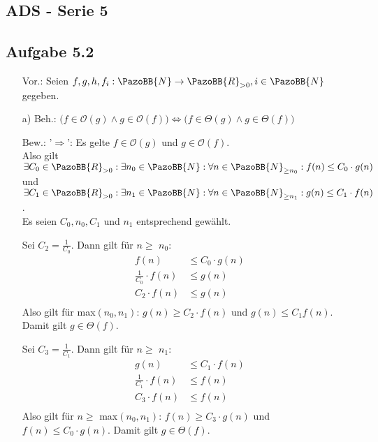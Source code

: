 \documentclass[12pt]{article}
\newcommand {\N}{\PazoBB{N}}   %
\newcommand {\R}{\PazoBB{R}}   %
\newcommand {\Om}{\mathcal{O}} %
\begin{document}
\subsection*{ADS - Serie 5}
\subsection*{Aufgabe 5.2}
\begin{enumerate}
\item[Vor.:] Seien $f, g, h, f_i: \N \to \R_{>0}, i\in\N$ gegeben.
\item[a) Beh.:] 
          $\big(f\in \Om(g) \land g \in \Om(f) \big) \Longleftrightarrow \big(f \in \Theta(g) \land g\in \Theta(f) \big)$
\item[Bew.:] '$\Longrightarrow$':
             Es gelte $f\in \Om(g)$ und $g \in \Om(f)$. \\
             Also gilt $\exists C_0 \in \R_{>0} : \exists n_0 \in \N : \forall n \in \N_{\geq n_0} : f(n) \leq C_0 \cdot g(n)$ \\
                   und  $\exists C_1 \in \R_{>0} : \exists n_1 \in \N : \forall n \in \N_{\geq n_1} : g(n) \leq C_1 \cdot f(n)$. \\
             Es seien $C_0, n_0, C_1$ und $n_1$ entsprechend gewählt. 

            Sei $C_2 = \frac{1}{ C_0}$.   Dann gilt für $n\geq$ $n_0$:
                      \begin{align*}
                                                         f(n)                       &  \leq C_0 \cdot g(n)              \\
                                          \frac{1}{ C_0}   \cdot f(n)  &  \leq g(n)                               \\
                                                            C_2   \cdot f(n)  &  \leq g(n)                               \\
                      \end{align*}
          Also gilt für max$(n_0, n_1)$:
                                     $g(n) \geq C_2 \cdot f(n)$ und $g(n) \leq C_1 f(n)$. Damit gilt $g \in \Theta (f)$.

          Sei $C_3 = \frac{1}{ C_1} $. Dann gilt für $n\geq$ $n_1$:
                      \begin{align*}
                                                        g(n)                                  &  \leq C_1 \cdot f(n)              \\
                                                     \frac{1}{ C_1}   \cdot f(n)  &  \leq f(n)                               \\
                                                                      C_3   \cdot f(n)  &  \leq f(n)                               \\
                      \end{align*}
                   Also gilt für $n\geq$ max$(n_0, n_1)$:
                                     $f(n) \geq C_3 \cdot g(n)$ und $f(n) \leq C_0 \cdot g(n)$. Damit gilt $g \in \Theta (f)$.\vspace{0.5cm}
                   

\end{enumerate}
\end{document}
